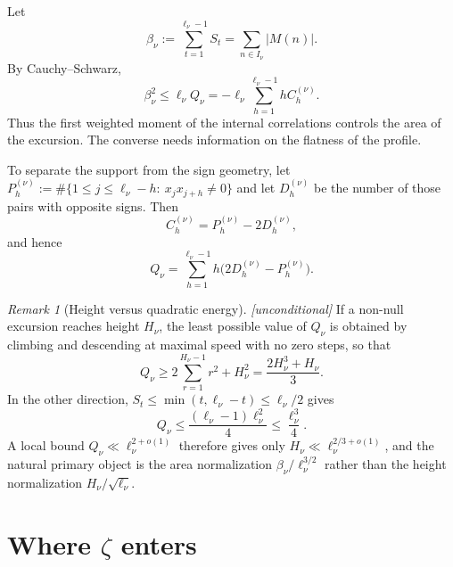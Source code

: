 \documentclass[11pt]{amsart}
\numberwithin{equation}{section}
\theoremstyle{plain}
\theoremstyle{definition}
\theoremstyle{remark}
\newtheorem{remark}[theorem]{Remark}
\begin{document}
Let
\begin{equation}
\label{eq:beta_def}
  \beta_\nu:=\sum_{t=1}^{\ell_\nu-1}S_t
             =\sum_{n\in I_\nu}|M(n)|.
\end{equation}
By Cauchy--Schwarz,
\begin{equation}
\label{eq:beta-Q}
  \beta_\nu^2\le \ell_\nu Q_\nu
  =-\ell_\nu\sum_{h=1}^{\ell_\nu-1}hC_h^{(\nu)}.
\end{equation}
Thus the first weighted moment of the internal correlations controls the area
of the excursion. The converse needs information on the flatness of the
profile.

To separate the support from the sign geometry, let
$P_h^{(\nu)}:=\#\{1\le j\le \ell_\nu-h:\ x_jx_{j+h}\ne0\}$ and let
$D_h^{(\nu)}$ be the number of those pairs with opposite signs. Then
\begin{equation}
\label{eq:C-P-D}
  C_h^{(\nu)}=P_h^{(\nu)}-2D_h^{(\nu)},
\end{equation}
and hence
\begin{equation}
\label{eq:Q-P-D}
  Q_\nu=\sum_{h=1}^{\ell_\nu-1}
  h\bigl(2D_h^{(\nu)}-P_h^{(\nu)}\bigr).
\end{equation}

\begin{remark}[Height versus quadratic energy]
\label{rem:height-Q}
\emph{[unconditional]} If a non-null excursion reaches height $H_\nu$, the
least possible value of $Q_\nu$ is obtained by climbing and descending at
maximal speed with no zero steps, so that
\begin{equation}
\label{eq:height_Q_min}
  Q_\nu\ge 2\sum_{r=1}^{H_\nu-1}r^2+H_\nu^2
  =\frac{2H_\nu^3+H_\nu}{3}.
\end{equation}
In the other direction, $S_t\le\min(t,\ell_\nu-t)\le\ell_\nu/2$ gives
\begin{equation}
\label{eq:Q_upper}
  Q_\nu\le\frac{(\ell_\nu-1)\ell_\nu^2}{4}\le\frac{\ell_\nu^3}{4}.
\end{equation}
A local bound $Q_\nu\ll \ell_\nu^{2+o(1)}$ therefore gives only
$H_\nu\ll \ell_\nu^{2/3+o(1)}$, and the natural primary object is the area
normalization $\beta_\nu/\ell_\nu^{3/2}$ rather than the height
normalization $H_\nu/\sqrt{\ell_\nu}$.
\end{remark}

\section{Where \texorpdfstring{$\zeta$}{zeta} enters}
\label{sec:zeta}
\end{document}
